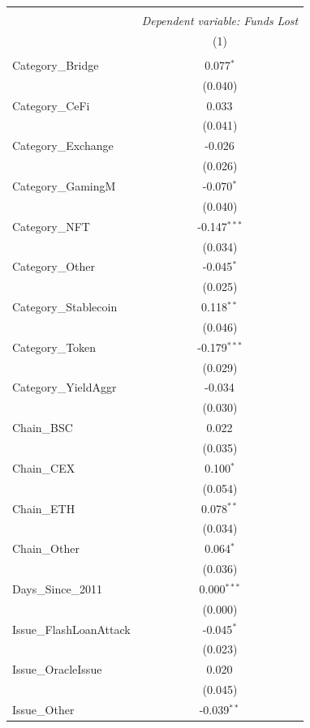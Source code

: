 \begin{table}[!htbp] \centering
\begin{tabular}{@{\extracolsep{5pt}}lc}
\\[-1.8ex]\hline
\hline \\[-1.8ex]
& \multicolumn{1}{c}{\textit{Dependent variable: Funds Lost}} \
\cr \cline{2-2}
\\[-1.8ex] & (1) \\
\hline \\[-1.8ex]
 Category\_Bridge & 0.077$^{*}$ \\
& (0.040) \\
 Category\_CeFi & 0.033$^{}$ \\
& (0.041) \\
 Category\_Exchange & -0.026$^{}$ \\
& (0.026) \\
 Category\_GamingM & -0.070$^{*}$ \\
& (0.040) \\
 Category\_NFT & -0.147$^{***}$ \\
& (0.034) \\
 Category\_Other & -0.045$^{*}$ \\
& (0.025) \\
 Category\_Stablecoin & 0.118$^{**}$ \\
& (0.046) \\
 Category\_Token & -0.179$^{***}$ \\
& (0.029) \\
 Category\_YieldAggr & -0.034$^{}$ \\
& (0.030) \\
 Chain\_BSC & 0.022$^{}$ \\
& (0.035) \\
 Chain\_CEX & 0.100$^{*}$ \\
& (0.054) \\
 Chain\_ETH & 0.078$^{**}$ \\
& (0.034) \\
 Chain\_Other & 0.064$^{*}$ \\
& (0.036) \\
 Days\_Since\_2011 & 0.000$^{***}$ \\
& (0.000) \\
 Issue\_FlashLoanAttack & -0.045$^{*}$ \\
& (0.023) \\
 Issue\_OracleIssue & 0.020$^{}$ \\
& (0.045) \\
 Issue\_Other & -0.039$^{**}$ \\

\end{tabular}
\end{table}
